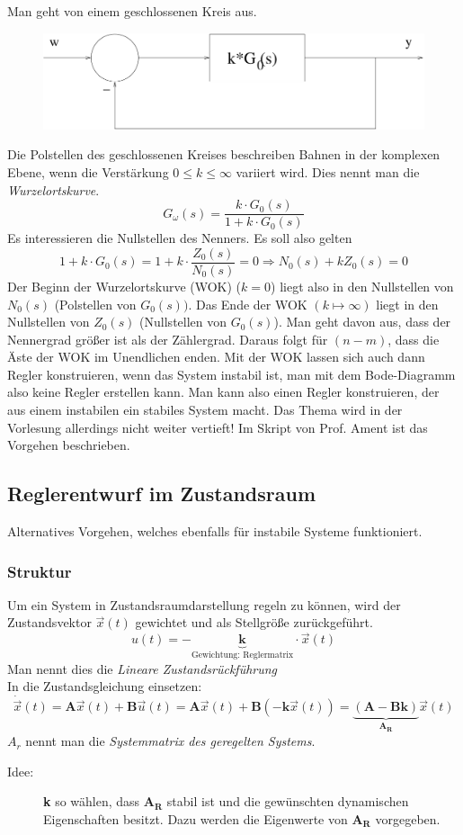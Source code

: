 \documentclass[12pt,a4paper,ngerman]{scrartcl}
\begin{document}
Man geht von einem geschlossenen Kreis aus.
\begin{figure}[H]
  \centering
  \includegraphics[width=.7\linewidth]{sysregel_No_5}
\end{figure}
Die Polstellen des geschlossenen Kreises beschreiben Bahnen in der komplexen Ebene, wenn die Verstärkung $0\leq k \leq\infty$ variiert wird. Dies nennt man die \emph{Wurzelortskurve}.
\[
G_\omega(s) =\frac{k\cdot G_0(s)}{1+k\cdot G_0(s)}
\]
Es interessieren die Nullstellen des Nenners. Es soll also gelten 
\[
1+k\cdot G_0(s)=1+k\cdot \frac{Z_0(s)}{N_0(s)}=0 \Rightarrow N_0(s)+kZ_0(s)=0
\]
Der Beginn der Wurzelortskurve (WOK) ($k=0$) liegt also in den Nullstellen von $N_0(s)$ (Polstellen von $G_0(s))$. Das Ende der WOK $(k\mapsto\infty)$ liegt in den Nullstellen von $Z_0(s)$ (Nullstellen von $G_0(s)$). Man geht davon aus, dass der Nennergrad größer ist als der Zählergrad. Daraus folgt für $(n-m)$, dass die Äste der WOK im Unendlichen enden.
Mit der WOK lassen sich auch dann Regler konstruieren, wenn das System instabil ist, man mit dem Bode-Diagramm also keine Regler erstellen kann. Man kann also einen Regler konstruieren, der aus einem instabilen ein stabiles System macht. Das Thema wird in der Vorlesung allerdings nicht weiter vertieft! Im Skript von Prof. Ament ist das Vorgehen beschrieben.

\subsection{Reglerentwurf im Zustandsraum}

Alternatives Vorgehen, welches ebenfalls für instabile Systeme funktioniert. 

\subsubsection{Struktur}

Um ein System in Zustandsraumdarstellung regeln zu können, wird der Zustandsvektor $\vec{x}(t)$ gewichtet und als Stellgröße zurückgeführt.  
\[
u(t)=-\underbrace{\mathbf{k}}_{\text{Gewichtung: Reglermatrix}}\cdot \vec{x}(t) 
\]
Man nennt dies die \emph{Lineare Zustandsrückführung}\\
In die Zustandsgleichung einsetzen:
\[
\dot{\vec{x}}(t)=\mathbf{A}\vec{x}(t)+\mathbf{B}\vec{u}(t)=\mathbf{A}\vec{x}(t)+\mathbf{B}(-\mathbf{k}\vec{x}(t))=\underbrace{(\mathbf{A}-\mathbf{Bk})}_{\mathbf{A_R}}\vec{x}(t)
\]
$A_r$ nennt man die \emph{Systemmatrix des geregelten Systems}. 
\begin{description}
\item[Idee:] \textbf{k} so wählen, dass $\mathbf{A_R}$ stabil ist und die gewünschten dynamischen Eigenschaften besitzt. Dazu werden die Eigenwerte von $\mathbf{A_R}$ vorgegeben.
\end{description}
\end{document}
